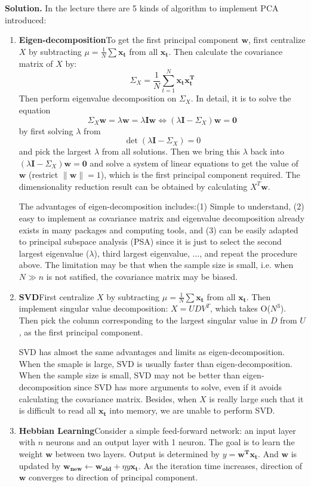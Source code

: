 \documentclass[12pt,a4paper,UTF8,fntef]{article}
\begin{document}
\textbf{Solution.} \quad In the lecture there are 5 kinds of algorithm to implement PCA introduced:
\begin{enumerate}
	\item \textbf{Eigen-decomposition}\quad To get the first principal component $\mathbf{w}$, first centralize $X$ by subtracting $\mu=\frac{1}{N}\sum\mathbf{x_t}$ from all $\mathbf{x_t}$. Then calculate the covariance matrix of $X$ by:
	$$
	\Sigma_X=\frac{1}{N}\sum_{t=1}^N \mathbf{x_t}\mathbf{x_t^T}
	$$
	Then perform eigenvalue decomposition on $\Sigma_X$. In detail, it is to solve the equation
	$$
	\Sigma_X\mathbf{w}=\lambda\mathbf{w}=\lambda\mathbf{Iw}\Leftrightarrow (\lambda\mathbf{I}-\Sigma_X)\mathbf{w}=\mathbf{0}
	$$
	by first solving $\lambda$ from
	$$
	\det(\lambda\mathbf{I}-\Sigma_X)=0
	$$
	and pick the largest $\lambda$ from all solutions. Then we bring this $\lambda$ back into $(\lambda\mathbf{I}-\Sigma_X)\mathbf{w}=\mathbf{0}$ and solve a system of linear equations to get the value of $\mathbf{w}$ (restrict $\| \mathbf{w}\|=1$), which is the first principal component required. The dimensionality reduction result can be obtained by calculating $X^T\mathbf{w}$.
	
	The advantages of eigen-decomposition includes:(1) Simple to understand, (2) easy to implement as covariance matrix and eigenvalue decomposition already exists in many packages and computing tools, and (3) can be easily adapted to principal subspace analysis (PSA) since it is just to select the second largest eigenvalue ($\lambda$), third largest eigenvalue, ..., and repeat the procedure above. The limitation may be that when the sample size is small, i.e. when $N\gg n$ is not satified, the covariance matrix may be biased. 
	\item \textbf{SVD}\quad First centralize $X$ by subtracting $\mu=\frac{1}{N}\sum\mathbf{x_t}$ from all $\mathbf{x_t}$. Then implement singular value decomposition: $X=UDV^T$, which takes O($N^3$). Then pick the column corresponding to the largest singular value in $D$ from $U$, as the first principal component. 
	
	SVD has almost the same advantages and limits as eigen-decomposition. When the smaple is large, SVD is usually faster than eigen-decomposition. When the sample size is small, SVD may not be better than eigen-decomposition since SVD has more arguments to solve, even if it avoids calculating the covariance matrix. Besides, when $X$ is really large such that it is difficult to read all $\mathbf{x_t}$ into memory, we are unable to perform SVD.
	\item \textbf{Hebbian Learning}\quad Consider a simple feed-forward network: an input layer with $n$ neurons and an output layer with 1 neuron. The goal is to learn the weight $\mathbf{w}$ between two layers. Output is determined by $y=\mathbf{w^Tx_t}$. And $\mathbf{w}$ is updated by $\mathbf{w_{new}}\leftarrow\mathbf{w_{old}}+\eta y\mathbf{x_t}$. As the iteration time increases, direction of $\mathbf{w}$ converges to direction of principal component. 
	

\end{enumerate}
\end{document}
